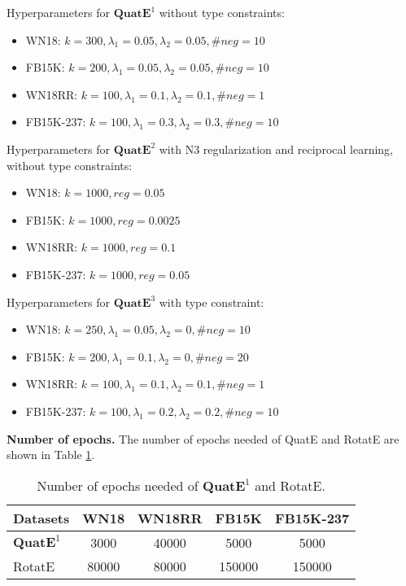 \documentclass{article}
\begin{document}
Hyperparameters for $\textbf{QuatE}^1$ without type constraints:
\begin{itemize}
    \item WN18: $k=300, \lambda_1=0.05, \lambda_2=0.05, \#neg=10$
    \item FB15K: $k=200, \lambda_1=0.05, \lambda_2 = 0.05, \#neg=10$
    \item WN18RR: $k=100, \lambda_1=0.1, \lambda_2=0.1, \#neg=1$
    \item FB15K-237: $k=100, \lambda_1=0.3, \lambda_2 = 0.3, \#neg=10$
\end{itemize}
Hyperparameters for $\textbf{QuatE}^2$ with N3 regularization and reciprocal learning, without type constraints:
\begin{itemize}
    \item WN18: $k=1000, reg=0.05$
    \item FB15K: $k=1000, reg=0.0025$
    \item WN18RR: $k=1000, reg= 0.1$
    \item FB15K-237: $k=1000, reg=0.05$
\end{itemize}
Hyperparameters for $\textbf{QuatE}^3$ with type constraint:
\begin{itemize}
    \item WN18: $k=250, \lambda_1=0.05, \lambda_2=0, \#neg=10$
    \item FB15K: $k=200, \lambda_1=0.1, \lambda_2 = 0, \#neg=20$
    \item WN18RR: $k=100, \lambda_1=0.1, \lambda_2=0.1, \#neg=1$
    \item FB15K-237: $k=100, \lambda_1=0.2, \lambda_2 = 0.2, \#neg=10$
\end{itemize}



\textbf{Number of epochs.} The number of epochs needed of QuatE and RotatE are shown in Table \ref{ref:table2}.

\begin{table}[h]
\centering
\caption{Number of epochs needed of $\textbf{QuatE}^1$ and RotatE.}
\begin{tabular}{|l|c|c|c|c|}
\hline
Datasets & WN18  & WN18RR & FB15K  & FB15K-237 \\ \hline
$\textbf{QuatE}^1$    & 3000  & 40000  & 5000   & 5000     \\ \hline
RotatE   & 80000 & 80000  & 150000 & 150000    \\ \hline
\end{tabular}
\label{ref:table2}
\end{table}
\end{document}
